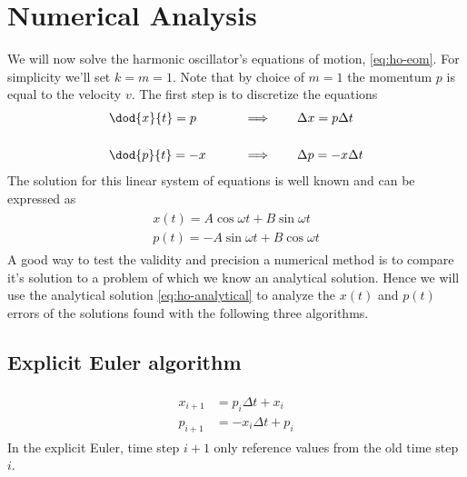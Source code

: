 \section{Numerical Analysis}
We will now solve the harmonic oscillator's equations of motion, \eqref{eq:ho-eom}. For simplicity we'll set $k = m = 1$. Note that by choice of $m=1$ the momentum $p$ is equal to the velocity $v$. The first step is to discretize the equations
\begin{alignat}{2}
&\dod{x}{t} = p  & \qquad \implies \qquad &\Delta x = p \Delta t \\[0.5cm]
&\dod{p}{t} = - x & \qquad \implies \qquad &\Delta p = - x \Delta t
\end{alignat}
The solution for this linear system of equations is well known and can be expressed as
\begin{align}
\begin{split}
\label{eq:ho-analytical}
x(t) = A \cos{\omega t} + B \sin{\omega t} \\
p(t) = -A \sin{\omega t} + B \cos{\omega t}
\end{split}
\end{align}
A good way to test the validity and precision a numerical method is to compare it's solution to a problem of which we know an analytical solution. Hence we will use the analytical solution \eqref{eq:ho-analytical} to analyze the $x(t)$ and $p(t)$ errors of the solutions found with the following three algorithms.

\subsection{Explicit Euler algorithm}
\begin{align}
\begin{split}
\label{al:ho-euler_e}
x_{i+1} &= p_i\Delta t + x_i \\
p_{i+1} &= -x_i\Delta t + p_i
\end{split}
\end{align}
In the explicit Euler, time step $i+1$ only reference values from the old time step $i$.

